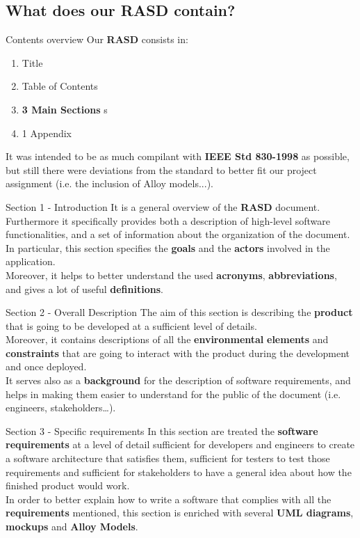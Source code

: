 \documentclass{../common/latex_classes/pdf_presentation}
\begin{document}
	\subsection{What does our RASD contain?}
	\begin{frame}{Contents overview}
		Our \textbf{RASD} consists in:
		\begin{enumerate}
			\item Title
			\item Table of Contents
			\item \textbf{3 Main Sections}
			s	\item 1 Appendix
		\end{enumerate}
		It was intended to be as much compilant with \textbf{IEEE Std 830-1998} as possible, but still there were deviations from the standard to better fit our project assignment (i.e. the inclusion of Alloy models...).
	\end{frame}
	\begin{frame}{Section 1 - Introduction}
		It is a general overview of the \textbf{RASD} document.\\
		Furthermore it specifically provides both a description of high-level software functionalities, and a set of information about the organization of the document.\\
		In particular, this section specifies the \textbf{goals} and the \textbf{actors} involved in the application.\\ 
		Moreover, it helps to better understand the used \textbf{acronyms}, \textbf{abbreviations}, and gives a lot of useful \textbf{definitions}.
	\end{frame}
	\begin{frame}{Section 2 - Overall Description}
		The aim of this section is describing the \textbf{product} that is going to be developed at a sufficient level of details.\\
		Moreover, it contains descriptions of all the \textbf{environmental} \textbf{elements} and \textbf{constraints} that are going to interact with the product during the development and once deployed.\\
		It serves also as a \textbf{background} for the description of software requirements, and helps in making them easier to understand for the public of the document (i.e. engineers, stakeholders…).
	\end{frame}
	\begin{frame}{Section 3 - Specific requirements}
		In this section are treated the \textbf{software requirements} at a level of detail sufficient for developers and engineers to create a software architecture that satisfies them, sufficient for testers to test those requirements and sufficient for stakeholders to have a general idea about how the finished product would work.\\
		In order to better explain how to write a software that complies with all the \textbf{requirements} mentioned, this section is enriched with several \textbf{UML diagrams}, \textbf{mockups} and \textbf{Alloy Models}. 
	\end{frame}
\end{document}
